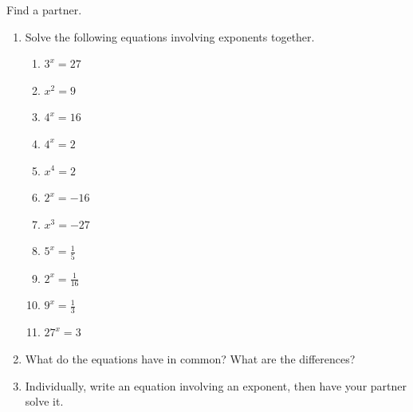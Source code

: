 \documentclass[noauthor]{ximera}
\begin{document}
\begin{problem}
Find a partner.

\begin{enumerate}
    \item Solve the following equations involving exponents together.
    \begin{enumerate}
        \item \(3^x = 27\)
        \item \(x^2 = 9\)
        \item \(4^x = 16\)
        \item \(4^x = 2\)
        \item \(x^4 = 2\)
        \item \(2^x = -16\)
        \item \(x^3 = -27\)
        \item \(5^x = \frac{1}{5}\)
        \item \(2^x = \frac{1}{16}\)
        \item \(9^x = \frac{1}{3}\)
        \item \(27^x = 3\)
    \end{enumerate}
    \item What do the equations have in common? What are the differences?
    \item Individually, write an equation involving an exponent, then have your partner solve it.
\end{enumerate}
\end{problem}
\end{document}
